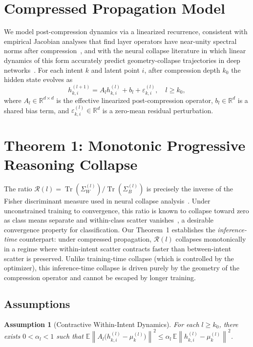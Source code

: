 \documentclass[lettersize,journal]{IEEEtran}
\newtheorem{assumption}{Assumption}
\newcommand{\R}{\mathbb{R}}
\newcommand{\E}{\mathbb{E}}
\newcommand{\tr}{\operatorname{Tr}}
\begin{document}
\section{Compressed Propagation Model}
We model post-compression dynamics via a linearized recurrence, consistent with empirical Jacobian analyses that find layer operators have near-unity spectral norms after compression~\cite{kim2024compressed}, and with the neural collapse literature in which linear dynamics of this form accurately predict geometry-collapse trajectories in deep networks~\cite{papyan2020prevalence,zhu2021geometric}. For each intent $k$ and latent point $i$, after compression depth $k_0$ the hidden state evolves as
\begin{equation}
h_{k,i}^{(l+1)} = A_l h_{k,i}^{(l)} + b_l + \varepsilon_{k,i}^{(l)},
\quad l \ge k_0,
\end{equation}
where $A_l \in \R^{d \times d}$ is the effective linearized post-compression operator, $b_l \in \R^d$ is a shared bias term, and $\varepsilon_{k,i}^{(l)} \in \R^d$ is a zero-mean residual perturbation.

\section{Theorem 1: Monotonic Progressive Reasoning Collapse}

The ratio $\mathcal{R}(l) = \tr(\Sigma_W^{(l)})/\tr(\Sigma_B^{(l)})$ is precisely the inverse of the Fisher discriminant measure used in neural collapse analysis~\cite{papyan2020prevalence}. Under unconstrained training to convergence, this ratio is known to collapse toward zero as class means separate and within-class scatter vanishes~\cite{zhu2021geometric,han2022neural}, a desirable convergence property for classification. Our Theorem~1 establishes the \emph{inference-time} counterpart: under compressed propagation, $\mathcal{R}(l)$ collapses monotonically in a regime where within-intent scatter contracts faster than between-intent scatter is preserved. Unlike training-time collapse (which is controlled by the optimizer), this inference-time collapse is driven purely by the geometry of the compression operator and cannot be escaped by longer training.

\subsection{Assumptions}
\begin{assumption}[Contractive Within-Intent Dynamics]
For each $l \ge k_0$, there exists $0 < \alpha_l < 1$ such that
$\E \left\|A_l\bigl(h_{k,i}^{(l)} - \mu_k^{(l)}\bigr)\right\|^2
\le
\alpha_l \,
\E \left\|h_{k,i}^{(l)} - \mu_k^{(l)}\right\|^2$.
\end{assumption}
\end{document}
